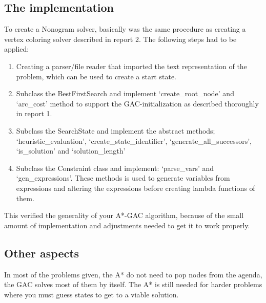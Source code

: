\subsection{The implementation}
To create a Nonogram solver, basically was the same procedure as creating a vertex coloring solver described in report 2. The following steps had to be applied:
\begin{enumerate}
	\item{Creating a parser/file reader that imported the text representation of the problem, which can be used to create a start state.}
	\item{Subclass the BestFirstSearch and implement `create\_root\_node' and `arc\_cost' method to support the GAC-initialization as described thoroughly in report 1.}
	\item{Subclass the SearchState and implement the abstract methods; `heuristic\_evaluation', `create\_state\_identifier', `generate\_all\_successors', `is\_solution' and `solution\_length' }
	\item{Subclass the Constraint class and implement: `parse\_vars' and `gen\_expressions'. These methods is used to generate variables from expressions and altering the expressions before creating lambda functions of them.}
\end{enumerate}

This verified the generality of your A*-GAC algorithm, because of the small amount of implementation and adjustments needed to get it to work properly.

\subsection{Other aspects}
In most of the problems given, the A* do not need to pop nodes from the agenda, the GAC solves most of them by itself. The A* is still needed for harder problems where you must guess states to get to a viable solution.


